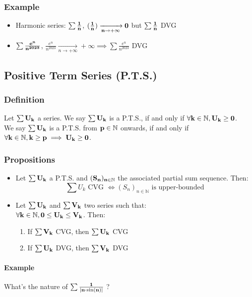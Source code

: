 \documentclass[notitlepage]{math}
\begin{document}
\subsubsection{Example}
\begin{itemize}
    \item Harmonic series: $\bf \sum \frac{1}{n}$, $\bf (\frac{1}{n}) \xrightarrow[n \to +\infty]{} 0$ but $\bf \sum \frac{1}{n}$ DVG
    \item $\bf \sum \frac{e^n}{n^{2023}}$, $\frac{e^n}{n^{2023}} \xrightarrow[n \to +\infty]{} +\infty \implies \sum \frac{e^n}{n^{2023}}$ DVG
    \end{itemize}

\subsection{Positive Term Series (P.T.S.)}
\subsubsection{Definition}
Let $\bf \sum U_k$ a series. We say $\bf \sum U_k$ is a P.T.S., 
if and only if $\bf \forall k \in \mathbb{N}, U_k \geq 0$.\\
We say $\bf \sum U_k$ is a P.T.S. from $\bf p \in \mathbb{N}$ onwards,
if and only if $\bf \forall k \in \mathbb{N}, k \geq p \implies U_k \geq 0$.
\subsubsection{Propositions}
\begin{itemize}
    \item Let $\bf \sum U_k$ a P.T.S. and $\bf (S_n)_{n \in \mathbb{N}}$ the associated partial sum sequence. Then:
    \[ \sum U_k \text{ CVG } \Leftrightarrow (S_n)_{n \in \mathbb{N}} \text{ is upper-bounded} \]
    \item Let $\bf \sum U_k$ and $\bf \sum V_k$ two series such that: \\
    $\bf \forall k \in \mathbb{N}, 0 \leq U_k \leq V_k$. Then:
    \begin{enumerate}
        \item If $\bf \sum V_k$ CVG, then $\bf \sum U_k$ CVG
        \item If $\bf \sum U_k$ DVG, then $\bf \sum V_k$ DVG
    \end{enumerate}
\end{itemize}
\paragraph{Example}
What's the nature of $\bf \sum \frac{1}{\lvert n \cdot \sin(n) \rvert}$ ?\\
\end{document}

